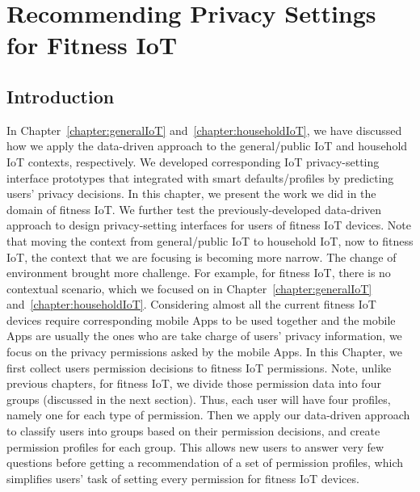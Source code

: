 \chapter{Recommending Privacy Settings for Fitness IoT}\label{chapter:fitnessIoT}

\section{Introduction}\label{fitnessIntro}
In Chapter~\ref{chapter:generalIoT} and~\ref{chapter:householdIoT}, we have discussed how we apply the data-driven approach to the general/public IoT and household IoT contexts, respectively. We developed corresponding IoT privacy-setting interface prototypes that integrated with smart defaults/profiles by predicting users' privacy decisions. In this chapter, we present the work we did in the domain of fitness IoT. We further test the previously-developed data-driven approach to design privacy-setting interfaces for users of fitness IoT devices. Note that moving the context from general/public IoT to household IoT, now to fitness IoT, the context that we are focusing is becoming more narrow. The change of environment brought more challenge. For example, for fitness IoT, there is no contextual scenario, which we focused on in Chapter~\ref{chapter:generalIoT} and~\ref{chapter:householdIoT}. Considering almost all the current fitness IoT devices require corresponding mobile Apps to be used together and the mobile Apps are usually the ones who are take charge of users' privacy information, we focus on the privacy permissions asked by the mobile Apps. In this Chapter, we first collect users permission decisions to fitness IoT permissions. Note, unlike previous chapters, for fitness IoT, we divide those permission data into four groups (discussed in the next section). Thus, each user will have four profiles, namely one for each type of permission. Then we apply our data-driven approach to classify users into groups based on their permission decisions, and create permission profiles for each group. This allows new users to answer very few questions before getting a recommendation of a set of permission profiles, which simplifies users' task of setting every permission for fitness IoT devices.


